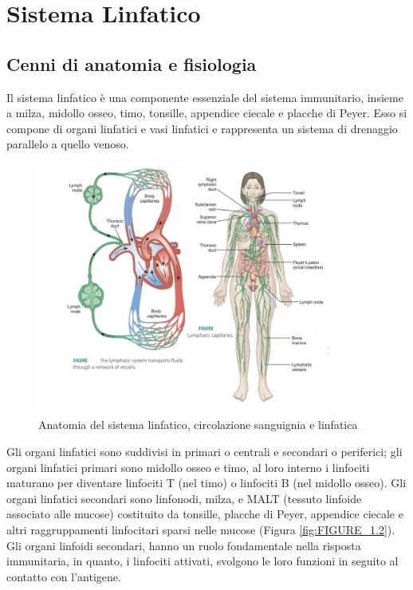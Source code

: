 \chapter{Sistema Linfatico}

\section{Cenni di anatomia e fisiologia}
Il sistema linfatico \`e una componente essenziale del sistema immunitario, 
insieme a milza, midollo osseo, timo, tonsille, appendice ciecale e placche di Peyer. 
Esso si compone di organi linfatici e vasi linfatici e rappresenta 
un sistema di drenaggio parallelo a quello venoso\cite{BOOK1}.

\begin{figure}[H]
    \begin{center}
    \includegraphics[width=0.9\columnwidth]{img/ANATOMY2.jpeg}
    \vspace{-3mm}
    \end{center}
    \caption{Anatomia del sistema linfatico, circolazione sanguignia e linfatica
    \cite{img1}}
\end{figure}


Gli organi linfatici sono suddivisi in primari o centrali 
e secondari o periferici; gli organi linfatici primari sono midollo osseo 
e timo, al loro interno i linfociti maturano per diventare linfociti T (nel timo) 
o linfociti B (nel midollo osseo). 
Gli organi linfatici secondari sono linfonodi, milza, e MALT 
(tessuto linfoide associato alle mucose) costituito da tonsille, 
placche di Peyer, appendice ciecale e altri raggruppamenti linfocitari 
sparsi nelle mucose (Figura \ref{fig:FIGURE_1.2}). Gli organi linfoidi secondari, hanno un ruolo fondamentale 
nella risposta immunitaria, in quanto, i linfociti attivati, svolgono le loro funzioni 
in seguito al contatto con l'antigene\cite{BOOK1}.

